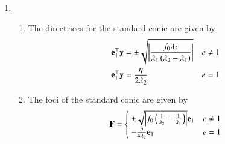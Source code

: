 \begin{enumerate}[label=\thesubsection.\arabic*.,ref=\thesubsection.\theenumi]
    \item\leavevmode
		\begin{enumerate}
			\item The directrices for the  standard conic are given by 
				\begin{align}
					\label{eq:dx-ell-hyp}
					\mathbf{e}_1^{\top}\mathbf{y} &=  
					\pm\sqrt{\left\vert\frac{f_0\lambda_2}{\lambda_1\left(\lambda_2-\lambda_1\right)}\right\vert} & e \ne 1
					\\
					\mathbf{e}_1^{\top}\mathbf{y} &= \frac{\eta}{2\lambda_2} & e = 1
					\label{eq:dx-parab}
				\end{align}
    \item The foci of the standard conic are given by 
				\begin{align}
					\label{eq:F-ell-hyp-parab}
					\mathbf{F} 
=
					\begin{cases}
						\pm \sqrt{\left\vert f_0\left(\frac{1}{\lambda_2}-\frac{1}{\lambda_1}\right)\right\vert}\mathbf{e}_1 & e \ne 1
						\\
						 -\frac{\eta}{4\lambda_2}\mathbf{e}_1 & e = 1
					\end{cases}
				\end{align}
	
		\end{enumerate}
    

\end{enumerate}

